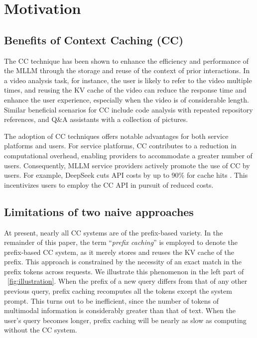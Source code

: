 \section{Motivation}

\subsection{Benefits of Context Caching (CC)}

The CC technique has been shown to enhance the efficiency and performance of the MLLM through the storage and reuse of the context of prior interactions. In a video analysis task, for instance, the user is likely to refer to the video multiple times, and reusing the KV cache of the video can reduce the response time and enhance the user experience, especially when the video is of considerable length. Similar beneficial scenarios for CC include code analysis with repeated repository references, and Q\&A assistants with a collection of pictures.

The adoption of CC techniques offers notable advantages for both service platforms and users. For service platforms, CC contributes to a reduction in computational overhead, enabling providers to accommodate a greater number of users. Consequently, MLLM service providers actively promote the use of CC by users. For example, DeepSeek cuts API costs by up to 90\% for cache hits \cite{deepseek_api}. This incentivizes users to employ the CC API in pursuit of reduced costs.


\subsection{Limitations of two naive approaches}

At present, nearly all CC systems are of the prefix-based variety. In the remainder of this paper, the term ``\textit{prefix caching}'' is employed to denote the prefix-based CC system, as it merely stores and reuses the KV cache of the prefix. This approach is constrained by the necessity of an exact match in the prefix tokens across requests. 
We illustrate this phenomenon in the left part of \figurename~\ref{fig:illustration}. When the prefix of a new query differs from that of any other previous query, prefix caching recomputes all the tokens except the system prompt. This turns out to be inefficient, since the number of tokens of multimodal information is considerably greater than that of text. When the user's query becomes longer, prefix caching will be nearly as slow as computing without the CC system.

